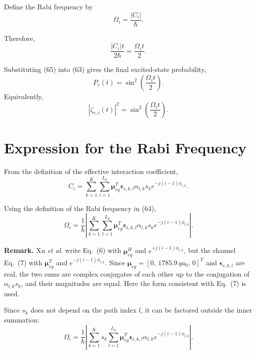 \documentclass[12pt,a4paper]{article}
\begin{document}
Define the Rabi frequency by
\begin{equation}
\boxed{
\Omega_i=\frac{|C_i|}{\hbar}
}.
\tag{64}
\end{equation}

Therefore,
\begin{equation}
\frac{|C_i|t}{2\hbar}=\frac{\Omega_i t}{2}.
\tag{65}
\end{equation}

Substituting (65) into (63) gives the final excited-state probability,
\begin{equation}
\boxed{
P_e(t)=\sin^2\left(\frac{\Omega_i t}{2}\right)
}.
\tag{66}
\end{equation}
Equivalently,
\begin{equation}
\boxed{
|\zeta_{e,i}(t)|^2=\sin^2\left(\frac{\Omega_i t}{2}\right)
}.
\tag{66a}
\end{equation}

\section{Expression for the Rabi Frequency}

From the definition of the effective interaction coefficient,
\begin{equation}
C_i
=
\sum_{k=1}^{K}
\sum_{l=1}^{L_k}
\boldsymbol{\mu}_{eg}^{T}
\boldsymbol{\epsilon}_{i,k,l}
\alpha_{l,k}s_k
 e^{-j(i-1)\phi_{l,k}}.
\tag{67}
\end{equation}

Using the definition of the Rabi frequency in (64),
\begin{equation}
\Omega_i
=
\frac{1}{\hbar}
\left|
\sum_{k=1}^{K}
\sum_{l=1}^{L_k}
\boldsymbol{\mu}_{eg}^{T}
\boldsymbol{\epsilon}_{i,k,l}
\alpha_{l,k}s_k
 e^{-j(i-1)\phi_{l,k}}
\right|.
\tag{68}
\end{equation}

\textbf{Remark.} Xu \emph{et al.} write Eq.~(6) with
$\boldsymbol\mu_{eg}^{H}$ and $e^{+j(i-1)\phi_{l,k}}$, but the channel
Eq.~(7) with $\boldsymbol\mu_{eg}^{T}$ and $e^{-j(i-1)\phi_{l,k}}$.
Since $\boldsymbol\mu_{eg}=[0,\,1785.9\,qa_0,\,0]^T$ and
$\boldsymbol\epsilon_{i,k,l}$ are real, the two sums are complex
conjugates of each other up to the conjugation of $\alpha_{l,k}s_k$,
and their magnitudes are equal. Here the form consistent with
Eq.~(7) is used.

Since $s_k$ does not depend on the path index $l$, it can be factored
outside the inner summation:
\begin{equation}
\Omega_i
=
\frac{1}{\hbar}
\left|
\sum_{k=1}^{K}
 s_k
\sum_{l=1}^{L_k}
\boldsymbol{\mu}_{eg}^{T}
\boldsymbol{\epsilon}_{i,k,l}
\alpha_{l,k}
 e^{-j(i-1)\phi_{l,k}}
\right|.
\tag{69}
\end{equation}
\end{document}
